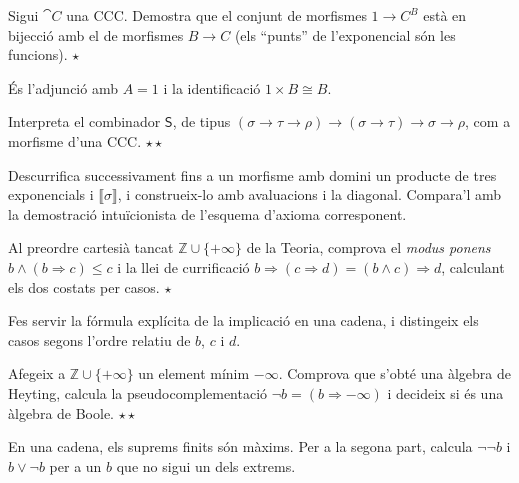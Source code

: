 \begin{exercici}
Sigui $\cat{C}$ una CCC. Demostra que el conjunt de morfismes $1\to C^{B}$ està en bijecció amb el de morfismes $B\to C$ (els \enquote{punts} de l'exponencial són les funcions). \hfill{\normalfont$\star$}
\begin{indicacio}
És l'adjunció amb $A=1$ i la identificació $1\times B\cong B$.
\end{indicacio}
\end{exercici}

\begin{exercici}
Interpreta el combinador $\mathsf{S}$, de tipus $(\sigma\to\tau\to\rho)\to(\sigma\to\tau)\to\sigma\to\rho$, com a morfisme d'una CCC. \hfill{\normalfont$\star\star$}
\begin{indicacio}
Descurrifica successivament fins a un morfisme amb domini un producte de tres exponencials i $\llbracket\sigma\rrbracket$, i construeix-lo amb avaluacions i la diagonal. Compara'l amb la demostració intuïcionista de l'esquema d'axioma corresponent.
\end{indicacio}
\end{exercici}

\begin{exercici}
Al preordre cartesià tancat $\mathbb Z\cup\{+\infty\}$ de la Teoria, comprova el \emph{modus ponens} $b\wedge(b\Rightarrow c)\leq c$ i la llei de currificació $b\Rightarrow(c\Rightarrow d)=(b\wedge c)\Rightarrow d$, calculant els dos costats per casos. \hfill{\normalfont$\star$}
\begin{indicacio}
Fes servir la fórmula explícita de la implicació en una cadena, i distingeix els casos segons l'ordre relatiu de $b$, $c$ i $d$.
\end{indicacio}
\end{exercici}

\begin{exercici}
Afegeix a $\mathbb Z\cup\{+\infty\}$ un element mínim $-\infty$. Comprova que s'obté una àlgebra de Heyting, calcula la pseudocomplementació $\neg b=(b\Rightarrow-\infty)$ i decideix si és una àlgebra de Boole. \hfill{\normalfont$\star\star$}
\begin{indicacio}
En una cadena, els suprems finits són màxims. Per a la segona part, calcula $\neg\neg b$ i $b\vee\neg b$ per a un $b$ que no sigui un dels extrems.
\end{indicacio}
\end{exercici}
